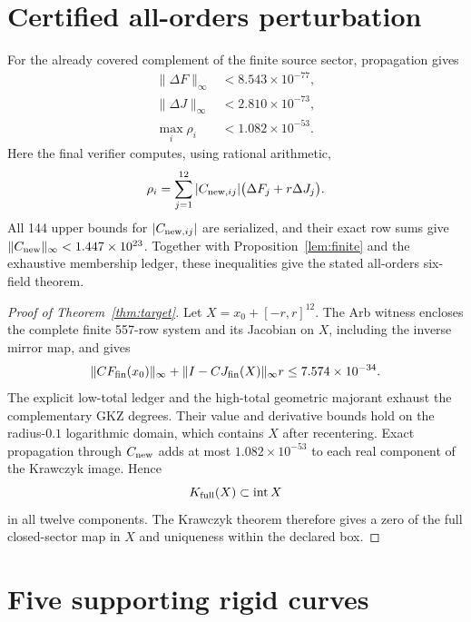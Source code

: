 \documentclass[11pt]{article}
\begin{document}
\section{Certified all-orders perturbation}

For the already covered complement of the finite source sector, propagation
gives
\begin{align}
 \lVert\Delta F\rVert_\infty &<8.543\times10^{-77},\\
 \lVert\Delta J\rVert_\infty &<2.810\times10^{-73},\\
 \max_i \rho_i &<1.082\times10^{-53}.
\end{align}
Here the final verifier computes, using rational arithmetic,
\begin{equation}
 \rho_i=\sum_{j=1}^{12}|C_{{\rm new},ij}|
       \bigl(\Delta F_j+r\Delta J_j\bigr).
\end{equation}
All 144 upper bounds for $|C_{{\rm new},ij}|$ are serialized, and their exact
row sums give $\lVert C_{\rm new}\rVert_\infty<1.447\times10^{23}$.
Together with Proposition~\ref{lem:finite} and the exhaustive membership
ledger, these inequalities give the stated all-orders six-field theorem.

\begin{proof}[Proof of Theorem~\ref{thm:target}]
Let $X=x_0+[-r,r]^{12}$. The Arb witness encloses the complete finite
557-row system and its Jacobian on $X$, including the inverse mirror map, and
gives
\begin{equation}
 \lVert C F_{\rm fin}(x_0)\rVert_\infty
 +\lVert I-CJ_{\rm fin}(X)\rVert_\infty r
 \le 7.574\times10^{-34}.
\end{equation}
The explicit low-total ledger and the high-total geometric majorant exhaust
the complementary GKZ degrees. Their value and derivative bounds hold on the
radius-$0.1$ logarithmic domain, which contains $X$ after recentering. Exact
propagation through $C_{\rm new}$ adds at most
$1.082\times10^{-53}$ to each real component of the Krawczyk image. Hence
\begin{equation}
 K_{\rm full}(X)\subset\operatorname{int}X
\end{equation}
in all twelve components. The Krawczyk theorem therefore gives a zero of the
full closed-sector map in $X$ and uniqueness within the declared box.
\end{proof}

\section{Five supporting rigid curves}
\end{document}
